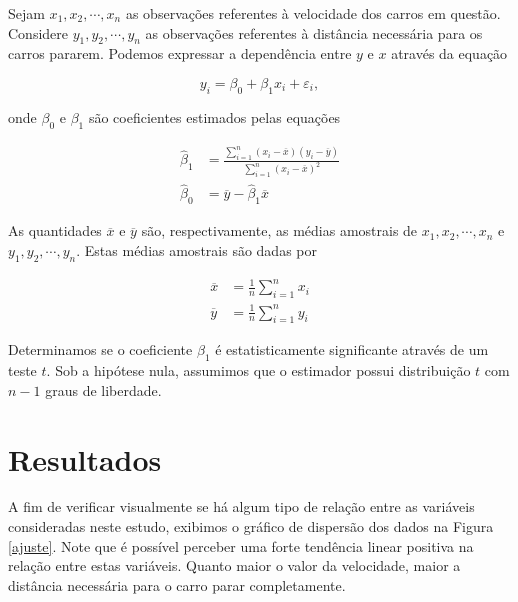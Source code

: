 \documentclass[12pt,twoside,printwatermark=false]{pinp}
\begin{document}
Sejam \(x_1, x_2, \cdots, x_n\) as observações referentes à velocidade
dos carros em questão. Considere \(y_1, y_2, \cdots, y_n\) as
observações referentes à distância necessária para os carros pararem.
Podemos expressar a dependência entre \(y\) e \(x\) através da equação

\begin{equation}
y_i = \beta_0 + \beta_1x_i + \varepsilon_i,
\end{equation}

\noindent onde \(\beta_0\) e \(\beta_1\) são coeficientes estimados
pelas equações

\begin{align}
\widehat{\beta}_1 &= \frac{\sum_{i=1}^n(x_i-\overline{x})(y_i-\overline{y})}{\sum_{i=1}^n(x_i-\overline{x})^2}  \label{estimadores01} \\
\widehat{\beta}_0 &= \overline{y}-\widehat{\beta}_1\overline{x}  \label{estimadores02}
\end{align}

\noindent As quantidades \(\overline{x}\) e \(\overline{y}\) são,
respectivamente, as médias amostrais de \(x_1, x_2, \cdots, x_n\) e
\(y_1, y_2, \cdots, y_n\). Estas médias amostrais são dadas por

\begin{align}
\overline{x} &= \frac{1}{n}\sum_{i=1}^nx_i \\
\overline{y} &= \frac{1}{n}\sum_{i=1}^ny_i 
\end{align}

Determinamos se o coeficiente \(\beta_1\) é estatisticamente
significante através de um teste \(t\). Sob a hipótese nula, assumimos
que o estimador possui distribuição \(t\) com \(n-1\) graus de
liberdade.

\hypertarget{resultados}{%
\section{Resultados}\label{resultados}}

A fim de verificar visualmente se há algum tipo de relação entre as
variáveis consideradas neste estudo, exibimos o gráfico de dispersão dos
dados na Figura \ref{ajuste}. Note que é possível perceber uma forte
tendência linear positiva na relação entre estas variáveis. Quanto maior
o valor da velocidade, maior a distância necessária para o carro parar
completamente.

\begin{Shaded}
\begin{Highlighting}[]
\NormalTok{(}\OperatorTok{+}
\StringTok{  }\NormalTok{() }\OperatorTok{+}
\StringTok{  }\NormalTok{(}\NormalTok{, }\NormalTok{)}
\end{Highlighting}
\end{Shaded}
\end{document}

